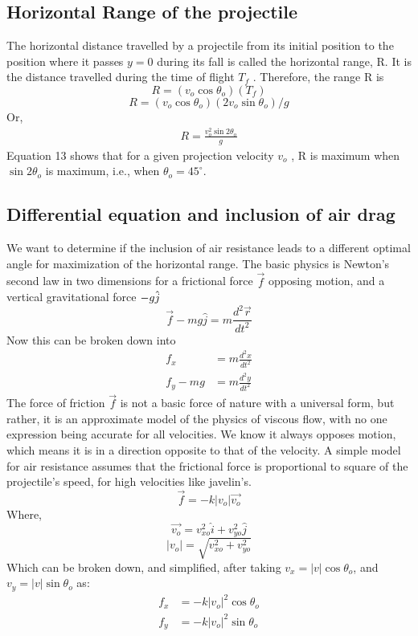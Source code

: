 \documentclass[12pt]{article}
\begin{document}
\subsection{Horizontal Range of the projectile}
The horizontal distance travelled by a projectile from its initial position to the position where it passes $y = 0$ during its fall is called the horizontal range, R. It is the distance travelled during the time of flight $T_f$ . Therefore, the range R is
$$R = (v_o \cos\theta_o)(T_f)$$ $$R = (v_o\cos\theta_o)(2v_o\sin\theta_o)/g$$
Or,
\begin{align}
    R = \frac{v^2_o\sin 2\theta_o}{g}
\end{align}
Equation 13 shows that for a given projection velocity $v_o$ , R is maximum when $\sin 2\theta_o$ is maximum, i.e., when $\theta_o = 45^{\circ}$.
\subsection{Differential equation and inclusion of air drag}
We want to determine if the inclusion of air resistance leads to a different optimal angle for maximization of the horizontal range. The basic physics is Newton’s second law in two dimensions for a frictional force $\Vec{f}$ opposing motion, and a vertical gravitational force $-g\textbf{\textbf{$\hat{j}$}}$
$$\Vec{f} - mg\hat{j} = m\frac{d^2\Vec{r}}{dt^2}$$
Now this can be broken down into 
\begin{align*}
    f_x &=  m\frac{d^2x}{dt^2}\\
    f_y - mg &= m\frac{d^2y}{dt^2}
\end{align*}
The force of friction $\Vec{f}$ is not a basic force of nature with a universal form, but rather, it is an approximate model of the physics of viscous flow, with no one expression being accurate for all velocities. We know it always opposes motion, which means it is in a direction opposite to that of the velocity. A simple model for air resistance assumes that the frictional force is proportional to square of the projectile’s speed, for high velocities like javelin's. 
$$\Vec{f} = -k|v_o|\Vec{v_o}$$
Where, $$\Vec{v_o} = v^2_{xo}\hat{i} + v^2_{yo}\hat{j}$$
$$|v_o| = \sqrt{v^2_{xo} + v^2_{yo}}$$
Which can be broken down, and simplified, after taking $v_x = |v|\cos\theta_o$, and $v_y = |v|\sin\theta_o$ as:
\begin{align}
   f_x &= -k|v_o|^2\cos\theta_o \\
   f_y &= -k|v_o|^2\sin\theta_o
\end{align}
\end{document}
